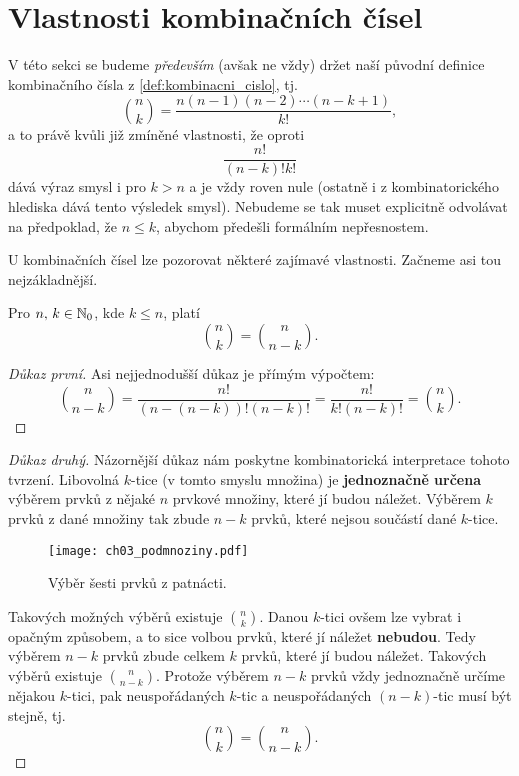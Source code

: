 \section{Vlastnosti kombinačních čísel}

V této sekci se budeme \emph{především} (avšak ne vždy) držet naší původní definice kombinačního čísla z \ref{def:kombinacni_cislo}, tj.
\[\binom{n}{k}=\dfrac{n(n-1)(n-2)\cdots(n-k+1)}{k!},\]
a to právě kvůli již zmíněné vlastnosti, že oproti
\[\dfrac{n!}{(n-k)!k!}\]
dává výraz smysl i pro $k>n$ a je vždy roven nule (ostatně i z kombinatorického hlediska dává tento výsledek smysl). Nebudeme se tak muset explicitně odvolávat na předpoklad, že $n\leqslant k$, abychom předešli formálním nepřesnostem.
\medskip

U kombinačních čísel lze pozorovat některé zajímavé vlastnosti. Začneme asi tou nejzákladnější.
\begin{theorem}\label{thm:symetrie_kombinacnich_cisel}
    Pro $n,\,k\in\mathbb{N}_0$, kde $k\leqslant n$, platí
    \[\binom{n}{k}=\binom{n}{n-k}.\]
\end{theorem}
\begin{proof}[Důkaz první]
    Asi nejjednodušší důkaz je přímým výpočtem:
    \[\binom{n}{n-k}=\dfrac{n!}{(n-(n-k))!(n-k)!}=\dfrac{n!}{k!(n-k)!}=\binom{n}{k}.\]
\end{proof}
\begin{proof}[Důkaz druhý]
    Názornější důkaz nám poskytne kombinatorická interpretace tohoto tvrzení. Libovolná $k$-tice (v tomto smyslu množina) je \textbf{jednoznačně určena} výběrem prvků z nějaké $n$ prvkové množiny, které jí budou náležet. Výběrem $k$ prvků z dané množiny tak zbude $n-k$ prvků, které nejsou součástí dané $k$-tice.
    \begin{figure}[H]
        \centering
        \texttt{[image: ch03\_podmnoziny.pdf]}
        \caption{Výběr šesti prvků z patnácti.}
        \label{fig:podmnoziny}
    \end{figure}
    Takových možných výběrů existuje $\binom{n}{k}$. Danou $k$-tici ovšem lze vybrat i opačným způsobem, a to sice volbou prvků, které jí náležet \textbf{nebudou}. Tedy výběrem $n-k$ prvků zbude celkem $k$ prvků, které jí budou náležet. Takových výběrů existuje $\binom{n}{n-k}$. Protože výběrem $n-k$ prvků vždy jednoznačně určíme nějakou $k$-tici, pak neuspořádaných $k$-tic a neuspořádaných $(n-k)$-tic musí být stejně, tj.
    \[\binom{n}{k}=\binom{n}{n-k}.\]
\end{proof}

